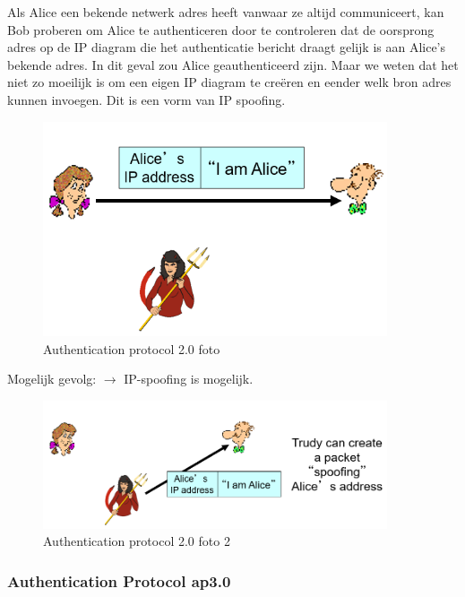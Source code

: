 Als Alice een bekende netwerk adres heeft vanwaar ze altijd communiceert, kan Bob proberen om Alice te authenticeren door te controleren dat de oorsprong adres op de IP diagram die het authenticatie bericht draagt gelijk is aan Alice’s bekende adres. In dit geval zou Alice geauthenticeerd zijn.
Maar we weten dat het niet zo moeilijk is om een eigen IP diagram te creëren en eender welk bron adres kunnen invoegen. Dit is een vorm van IP spoofing.
\begin{figure}[h]
    \centering
    \includegraphics[width=4in]{./img/imghfdst8/hfdst8puntje14.png}
    \caption{Authentication protocol 2.0 foto  }     
    \label{fig:Authentication protocol 2.0 foto 1}
\end{figure}

\noindent Mogelijk gevolg: $\rightarrow$ IP-spoofing is mogelijk.

\begin{figure}[h]
    \centering
    \includegraphics[width=4in]{./img/imghfdst8/hfdst8puntje15.png}
    \caption{Authentication protocol 2.0 foto 2}      
    \label{fig:Authentication protocol 2.0 foto 2}
\end{figure}

\subsubsection{Authentication Protocol ap3.0}

